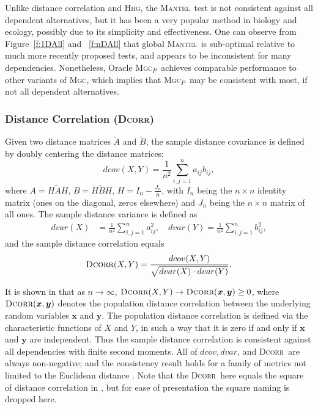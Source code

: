 \documentclass[11pt]{article}
\providecommand{\sct}[1]{{\normalfont\textsc{#1}}}
\providecommand{\mb}[1]{\boldsymbol{#1}}
\newcommand{\Mgc}{\sct{Mgc}}
\newcommand{\Mgcp}{\sct{Mgc$_P$}}
\newcommand{\Hhg}{\sct{Hhg}}
\newcommand{\Dcorr}{\sct{Dcorr}}
\newcommand{\Mantel}{\sct{Mantel}}
\begin{document}
Unlike distance correlation and \Hhg, the \Mantel~test is not consistent against all dependent alternatives, but it has been a very popular method in biology and ecology, possibly due to its simplicity and effectiveness. One can observe from Figure~\ref{f:1DAll} and ~\ref{f:nDAll} that global \Mantel~is sub-optimal relative to much more recently proposed tests, and appears to be inconsistent for many dependencies. Nonetheless, Oracle \Mgcp~achieves comparable performance to other variants of \Mgc, which implies that \Mgcp~may be consistent with most, if not all dependent alternatives.

\subsubsection{Distance Correlation (\Dcorr)}
\label{appen:dcorr}
Given two distance matrices $\tilde{A}$ and $\tilde{B}$, the sample distance covariance is defined by doubly centering the distance matrices:
\begin{equation*}
\label{dcovEqu}
dcov(X,Y)=\frac{1}{n^2}\sum_{i,j=1}^{n}a_{ij}b_{ij},
\end{equation*}
where $A=H\tilde{A}H$, $B=H\tilde{B}H$, $H=I_{n}-\frac{J_{n}}{n}$, with $I_n$ being the $n \times n$ identity matrix (ones on the diagonal, zeros elsewhere) and $J_n$ being the $n \times n$ matrix of all ones. The sample distance variance is defined as
\begin{align*}
dvar(X) &=\frac{1}{n^2}\sum_{i,j=1}^{n}a_{ij}^{2},\quad dvar(Y) =\frac{1}{n^2}\sum_{i,j=1}^{n}b_{ij}^{2},
\end{align*}
and the sample distance correlation equals
\begin{equation*}
\Dcorr(X,Y)=\frac{dcov(X,Y)}{\sqrt{dvar(X) \cdot dvar(Y)}}.
\end{equation*}

It is shown in \cite{SzekelyRizzoBakirov2007} that as $n \rightarrow \infty$, $\Dcorr(X,Y) \rightarrow \Dcorr(\mb{x},\mb{y}) \geq 0$, where $\Dcorr(\mb{x},\mb{y})$ denotes the population distance correlation between the underlying random variables $\mb{x}$ and $\mb{y}$. The population distance correlation is defined via the characteristic functions of $X$ and $Y$, in such a way that it is zero if and only if $\mb{x}$ and $\mb{y}$ are independent. Thus the sample distance correlation is consistent against all dependencies with finite second moments. All of $dcov, dvar$, and \Dcorr~are always non-negative; and the consistency result holds for a family of metrics not limited to the Euclidean distance \cite{Lyons2013}. Note that the \Dcorr~here equals the square of distance correlation in \cite{SzekelyRizzoBakirov2007}, but for ease of presentation the square naming is dropped here.
\end{document}
